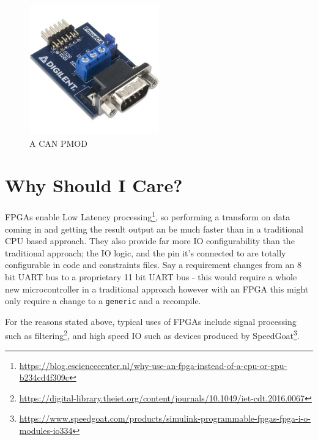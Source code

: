 \begin{figure}[H]
    \begin{center}
        \includegraphics[width=0.5\textwidth]{./src/pmod_can.png}
        \caption{A CAN PMOD}
        \label{fig:pmod}
    \end{center}
\end{figure}
\pagebreak
\tableofcontents
\listoffigures
\listoftables
\pagebreak

\setlength{\parskip}{\medskipamount}

\section{Why Should I Care?}
FPGAs enable Low Latency processing\footnote{\url{https://blog.esciencecenter.nl/why-use-an-fpga-instead-of-a-cpu-or-gpu-b234cd4f309c}}, so performing a transform on data coming in and getting the result output an be much faster than in a traditional CPU based approach. They also provide far more IO configurability than the traditional approach; the IO logic, and the pin it's connected to are totally configurable in code and constraints files\handwaving. Say a requirement changes from an 8 bit UART bus to a proprietary 11 bit UART bus - this would require a whole new microcontroller in a traditional approach however with an FPGA this might only require a change to a \texttt{generic} and a recompile. 

For the reasons stated above, typical uses of FPGAs include signal processing such as filtering\footnote{\url{https://digital-library.theiet.org/content/journals/10.1049/iet-cdt.2016.0067}}, and high speed IO such as devices produced by SpeedGoat\footnote{\url{https://www.speedgoat.com/products/simulink-programmable-fpgas-fpga-i-o-modules-io334}}.

